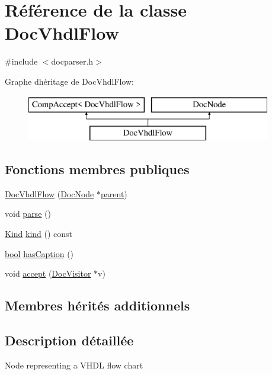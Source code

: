 \hypertarget{class_doc_vhdl_flow}{}\section{Référence de la classe Doc\+Vhdl\+Flow}
\label{class_doc_vhdl_flow}


{\ttfamily \#include $<$docparser.\+h$>$}

Graphe d\textquotesingle{}héritage de Doc\+Vhdl\+Flow\+:\begin{figure}[H]
\begin{center}
\leavevmode
\includegraphics[height=2.000000cm]{class_doc_vhdl_flow}
\end{center}
\end{figure}
\subsection*{Fonctions membres publiques}
\begin{DoxyCompactItemize}
\item 
\hyperlink{class_doc_vhdl_flow_accbe4d668c89baf4b123d9f2453c7c22}{Doc\+Vhdl\+Flow} (\hyperlink{class_doc_node}{Doc\+Node} $\ast$\hyperlink{class_doc_node_a990d8b983962776a647e6231d38bd329}{parent})
\item 
void \hyperlink{class_doc_vhdl_flow_afe55c9c5bf1a823e78d6aa3ea3f0777b}{parse} ()
\item 
\hyperlink{class_doc_node_aebd16e89ca590d84cbd40543ea5faadb}{Kind} \hyperlink{class_doc_vhdl_flow_a8fdb29b6f93e88bf2e45510c6b712f17}{kind} () const 
\item 
\hyperlink{qglobal_8h_a1062901a7428fdd9c7f180f5e01ea056}{bool} \hyperlink{class_doc_vhdl_flow_a5b87893dd7549619f309c37386095ac8}{has\+Caption} ()
\item 
void \hyperlink{class_doc_vhdl_flow_ad17bde1b8f83295658f79669479c9262}{accept} (\hyperlink{class_doc_visitor}{Doc\+Visitor} $\ast$v)
\end{DoxyCompactItemize}
\subsection*{Membres hérités additionnels}


\subsection{Description détaillée}
Node representing a V\+H\+D\+L flow chart 

